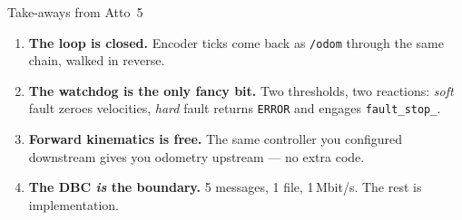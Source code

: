\begin{frame}{Take-aways from Atto~5}
  \begin{enumerate}\setlength\itemsep{2pt}
    \item \textbf{The loop is closed.} Encoder ticks come back as
          \texttt{/odom} through the same chain, walked in reverse.
    \item \textbf{The watchdog is the only fancy bit.} Two thresholds,
          two reactions: \emph{soft} fault zeroes velocities, \emph{hard}
          fault returns \texttt{ERROR} and engages \texttt{fault\_stop\_}.
    \item \textbf{Forward kinematics is free.} The same controller you
          configured downstream gives you odometry upstream — no extra
          code.
    \item \textbf{The DBC \emph{is} the boundary.} 5 messages, 1
          file, 1\,Mbit/s. The rest is implementation.
  \end{enumerate}
\end{frame}
